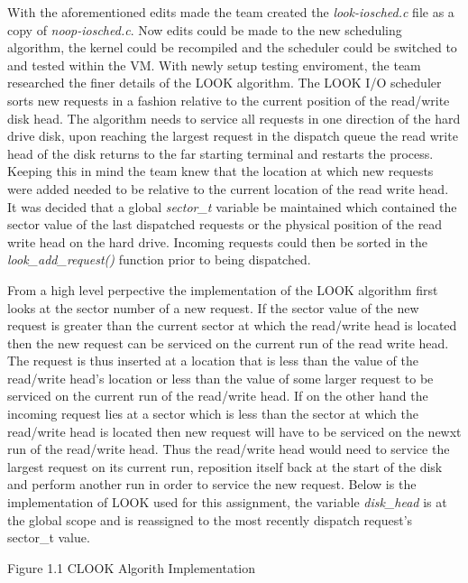 \documentclass[10pt,onecolumn,draftclsnofoot]{IEEEtran} %
\begin{document}
\begin{singlespace}
	\normalfont \indent With the aforementioned edits made the team created the \textit{look-iosched.c} file as a copy of \textit{noop-iosched.c}. Now edits could be made to the new scheduling algorithm, the kernel could be recompiled and the scheduler could be switched to and tested within the VM. With newly setup testing enviroment, the team researched the finer details of the LOOK algorithm. The LOOK I/O scheduler sorts new requests in a fashion relative to the current position of the read/write disk head. The algorithm needs to service all requests in one direction of the hard drive disk, upon reaching the largest request in the dispatch queue the read write head of the disk returns to the far starting terminal and restarts the process. Keeping this in mind the team knew that the location at which new requests were added needed to be relative to the current location of the read write head. It was decided that a global \textit{sector\_t} variable be maintained which contained the sector value of the last dispatched requests or the physical position of the read write head on the hard drive. Incoming requests could then be sorted in the \textit{look\_add\_request()} function prior to being dispatched. 
	
	\normalfont \indent From a high level perpective the implementation of the LOOK algorithm first looks at the sector number of a new request. If the sector value of the new request is greater than the current sector at which the read/write head is located then the new request can be serviced on the current run of the read write head. The request is thus inserted at a location that is less than the value of the read/write head's location or less than the value of some larger request to be serviced on the current run of the read/write head. If on the other hand the incoming request lies at a sector which is less than the sector at which the read/write head is located then new request will have to be serviced on the newxt run of the read/write head. Thus the read/write head would need to service the largest request on its current run, reposition itself back at the start of the disk and perform another run in order to service the new request. Below is the implementation of LOOK used for this assignment, the variable \textit{disk\_head} is at the global scope and is reassigned to the most recently dispatch request's sector\_t value.

\newpage 

\begin{center}
Figure 1.1 CLOOK Algorith Implementation
\end{center}


\end{singlespace}
\end{document}
